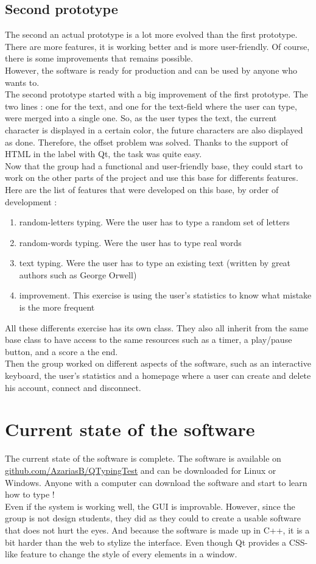 \section{Second prototype}
The second an actual prototype is a lot more evolved than the first prototype. There are more features, it is working better and is more user-friendly. Of course, there is some improvements that remains possible.\\
However, the software is ready for production and can be used by anyone who wants to.\\
The second prototype started with a big improvement of the first prototype. The two lines : one for the text, and one for the text-field where the user can type, were merged into a single one. So, as the user types the text, the current character is displayed in a certain color, the future characters are also displayed as done. Therefore, the offset problem was solved. Thanks to the support of HTML in the label with Qt, the task was quite easy.\\
Now that the group had a functional and user-friendly base, they could start to work on the other parts of the project and use this base for differents features.\\
Here are the list of features that were developed on this base, by order of development :
\begin{enumerate}
	\item random-letters typing. Were the user has to type a random set of letters
	\item random-words typing. Were the user has to type real words
	\item text typing. Were the user has to type an existing text (written by great authors such as George Orwell)
	\item improvement. This exercise is using the user's statistics to know what mistake is the more frequent
\end{enumerate}
All these differents exercise has its own class. They also all inherit from the same base class to have access to the same resources such as a timer, a play/pause button, and a score a the end.\\
Then the group worked on different aspects of the software, such as an interactive keyboard, the user's statistics and a homepage where a user can create and delete his account, connect and disconnect.


\chapter{Current state of the software}
The current state of the software is complete. The software is available on \url{github.com/AzariasB/QTypingTest} and can be downloaded for Linux or Windows. Anyone with a computer can download the software and start to learn how to type !\\
Even if the system is working well, the GUI is improvable. However, since the group is not design students, they did as they could to create a usable software that does not hurt the eyes. And because the software is made up in C++, it is a bit harder than the web to stylize the interface. Even though Qt provides a CSS-like feature to change the style of every elements in a window.


